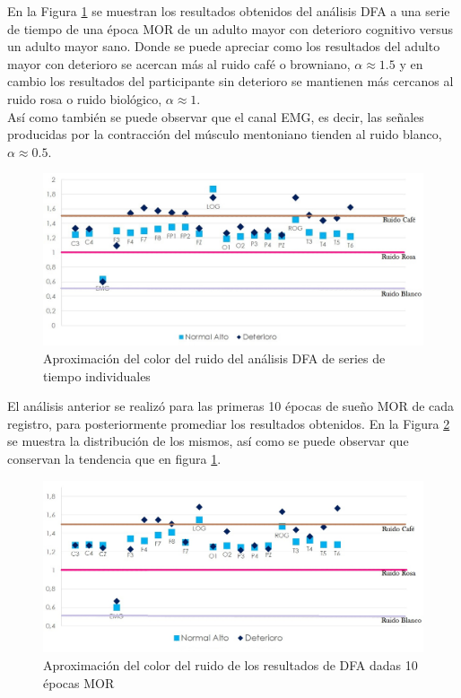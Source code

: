 \documentclass[letterpaper,titlepage,12pt,draft]{report}
\begin{document}
En la Figura \ref{fig:c1_1} se muestran los resultados obtenidos del an\'alisis DFA a una serie de tiempo de una \'epoca MOR de un adulto mayor con deterioro cognitivo versus un adulto mayor sano. Donde se puede apreciar como los resultados del adulto mayor con deterioro se acercan m\'as al ruido caf\'e o browniano, $\alpha\approx 1.5$ y en cambio los resultados del participante sin deterioro se mantienen m\'as cercanos al ruido rosa o ruido biol\'ogico, $\alpha\approx 1$.\\

As\'i como tambi\'en se puede observar que el canal EMG, es decir, las se\~nales producidas por la contracci\'on del m\'usculo mentoniano tienden al ruido blanco, $\alpha\approx 0.5$.\\

\begin{figure}[H]
\centering
\includegraphics[scale=0.5]{comp1_1.jpg}
\caption{Aproximaci\'on del color del ruido del an\'alisis DFA de series de tiempo individuales}
\label{fig:c1_1}
\end{figure}

El an\'alisis anterior se realiz\'o para las primeras 10 \'epocas de sue\~no MOR de cada registro, para posteriormente promediar los resultados obtenidos. En la Figura \ref{fig:c1_3} se muestra la distribuci\'on de los mismos, as\'i como se puede observar que conservan la tendencia que en figura \ref{fig:c1_1}.

\begin{figure}[H]
\centering
\includegraphics[scale=0.5]{comp1_3.jpg}
\caption{Aproximaci\'on del color del ruido de los resultados de DFA dadas 10 \'epocas MOR}
\label{fig:c1_3}
\end{figure}
\end{document}
